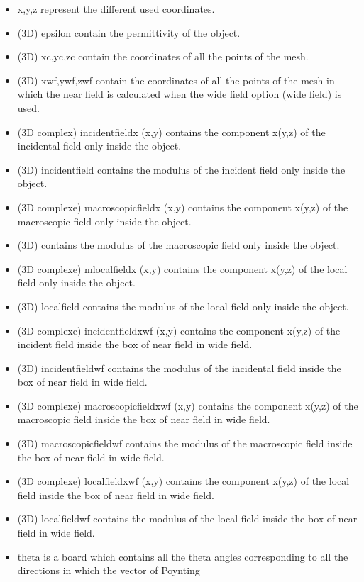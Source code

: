 \begin{itemize}
\item x,y,z represent the different used coordinates.
\item (3D) epsilon contain the permittivity of the object.
\item (3D) xc,yc,zc contain the coordinates of all the points of the
  mesh.
\item (3D) xwf,ywf,zwf contain the coordinates of all the points of
  the mesh in which the near field is calculated when the wide field
  option (wide field) is used.
\item (3D complex) incidentfieldx (x,y) contains the component x(y,z)
  of the incidental field only inside the object.
\item (3D) incidentfield contains the modulus of the incident field
  only inside the object.
\item (3D complexe) macroscopicfieldx (x,y) contains the component
  x(y,z) of the macroscopic field only inside the object.
\item (3D) contains the modulus of the macroscopic field only inside the object.
\item (3D complexe) mlocalfieldx (x,y) contains the component x(y,z)
  of the local field only inside the object.
\item (3D) localfield contains the modulus of the local field only
  inside the object.
\item (3D complexe) incidentfieldxwf (x,y) contains the component
  x(y,z) of the incident field inside the box of near field in wide
  field.
\item (3D) incidentfieldwf contains the modulus of the incidental
  field inside the box of near field in wide field.
\item (3D complexe) macroscopicfieldxwf (x,y) contains the component
  x(y,z) of the macroscopic field inside the box of near field in wide
  field.
\item (3D) macroscopicfieldwf contains the modulus of the macroscopic
  field inside the box of near field in wide field.
\item (3D complexe) localfieldxwf (x,y) contains the component x(y,z)
  of the local field inside the box of near field in wide field.
\item (3D) localfieldwf contains the modulus of the local field inside
  the box of near field in wide field.
\item theta is a board which contains all the theta angles
  corresponding to all the directions in which the vector of Poynting

\end{itemize}
